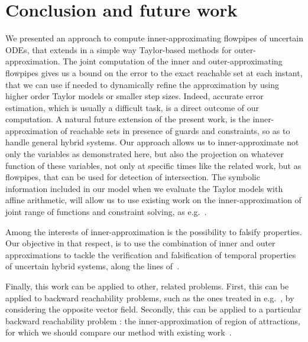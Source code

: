 \documentclass{sig-alternate-05-2015}
\begin{document}
\section{Conclusion and future work}
%
We presented an approach to compute inner-approxima\-ting flowpipes of uncertain ODEs, that extends in a simple way Taylor-based 
methods for outer-approximation. %
The joint computation of the inner and outer-approximating flowpipes gives us a bound on the error to the exact reachable 
set at each instant, that we can use if needed to dynamically refine the approximation by using higher order Taylor models or smaller step sizes. 
Indeed, accurate error estimation, which is usually a difficult task, is a direct outcome of our computation.
A natural future extension of the present work, is the inner-approximation of reachable sets 
in presence of guards and constraints, so as to handle general hybrid systems. Our approach allows us to inner-approximate 
not only the variables as demonstrated here, but also the projection on whatever function of these variables, not only at 
specific times like the related work, but as flowpipes, that can be used for detection of intersection. 
The symbolic information included in our model  when we evaluate the Taylor models with affine arithmetic, 
will allow us to use existing work on the inner-approximation 
of joint range of functions and constraint solving, as e.g.~\cite{DBLP:journals/constraints/IshiiGJ12}.  

Among the interests of inner-approximation is the possibility to falsify properties. Our objective in that respect, 
is to use the combination of inner and outer approximations to tackle the verification and falsification of temporal properties
of uncertain hybrid systems, along the lines of~\cite{falsification2,IshiiYG16}. 


Finally, this work can be applied to other, related problems. First, this can be applied
to backward reachability problems, such as the ones treated in e.g.~\cite{underapprox16}, by considering
the opposite vector field. Secondly, this can be applied to a particular backward 
reachability problem : the inner-approximation of region
of attractions, for which we should compare our method with existing work~\cite{DBLP:conf/nolcos/KordaHJ13}. 
\end{document}

